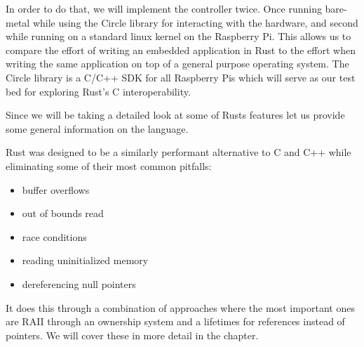 In order to do that, we will implement the controller twice.
Once running bare-metal while using the Circle library for interacting with the hardware,
and second while running on a standard linux kernel on the Raspberry Pi.
This allows us to compare the effort of writing an embedded application in Rust to the effort
when writing the same application on top of a general purpose operating system.
The Circle library is a C/C++ SDK for all Raspberry Pis which will serve as our test bed for exploring Rust's C interoperability.

Since we will be taking a detailed look at some of Rusts features let us provide some general information on the language.

Rust was designed to be a similarly performant alternative to C and C++ while eliminating some of their most common pitfalls:
\begin{itemize}
    \item buffer overflows
    \item out of bounds read
    \item race conditions
    \item reading uninitialized memory
    \item dereferencing null pointers
\end{itemize}

It does this through a combination of approaches where the most important ones are RAII through an ownership system and a lifetimes for references instead of pointers.
We will cover these in more detail in the  chapter.
